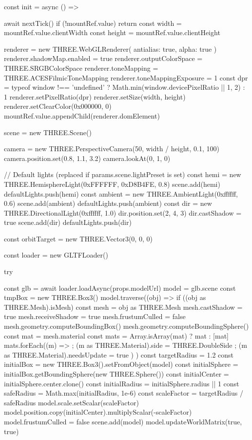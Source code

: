 \documentclass[twoside]{thesis-cls-Miya} %
\begin{document}
const init = async () => {
  await nextTick()
  if (!mountRef.value) return
  const width = mountRef.value.clientWidth
  const height = mountRef.value.clientHeight

  renderer = new THREE.WebGLRenderer({ antialias: true, alpha: true })
  renderer.shadowMap.enabled = true
  renderer.outputColorSpace = THREE.SRGBColorSpace
  renderer.toneMapping = THREE.ACESFilmicToneMapping
  renderer.toneMappingExposure = 1
  const dpr = typeof window !== 'undefined' ? Math.min(window.devicePixelRatio || 1, 2) : 1
  renderer.setPixelRatio(dpr)
  renderer.setSize(width, height)
  renderer.setClearColor(0x000000, 0)
  mountRef.value.appendChild(renderer.domElement)

  scene = new THREE.Scene()

  camera = new THREE.PerspectiveCamera(50, width / height, 0.1, 100)
  camera.position.set(0.8, 1.1, 3.2)
  camera.lookAt(0, 1, 0)

  // Default lights (replaced if params.scene.lightPreset is set)
  const hemi = new THREE.HemisphereLight(0xFFFFFF, 0xD8B4FE, 0.8)
  scene.add(hemi)
  defaultLights.push(hemi)
  const ambient = new THREE.AmbientLight(0xffffff, 0.6)
  scene.add(ambient)
  defaultLights.push(ambient)
  const dir = new THREE.DirectionalLight(0xffffff, 1.0)
  dir.position.set(2, 4, 3)
  dir.castShadow = true
  scene.add(dir)
  defaultLights.push(dir)

  const orbitTarget = new THREE.Vector3(0, 0, 0)

  const loader = new GLTFLoader()

  try {
    const glb = await loader.loadAsync(props.modelUrl)
    model = glb.scene
    const tmpBox = new THREE.Box3()
    model.traverse((obj) => {
      if ((obj as THREE.Mesh).isMesh) {
        const mesh = obj as THREE.Mesh
        mesh.castShadow = true
        mesh.receiveShadow = true
        mesh.frustumCulled = false
        mesh.geometry.computeBoundingBox()
        mesh.geometry.computeBoundingSphere()
        const mat = mesh.material
        const mats = Array.isArray(mat) ? mat : [mat]
        mats.forEach((m) => {
          ; (m as THREE.Material).side = THREE.DoubleSide
            ; (m as THREE.Material).needsUpdate = true
        })
      }
    })
    const targetRadius = 1.2
    const initialBox = new THREE.Box3().setFromObject(model)
    const initialSphere = initialBox.getBoundingSphere(new THREE.Sphere())
    const initialCenter = initialSphere.center.clone()
    const initialRadius = initialSphere.radius || 1
    const safeRadius = Math.max(initialRadius, 1e-6)
    const scaleFactor = targetRadius / safeRadius
    model.scale.setScalar(scaleFactor)
    model.position.copy(initialCenter).multiplyScalar(-scaleFactor)
    model.frustumCulled = false
    scene.add(model)
    model.updateWorldMatrix(true, true)

}}
\end{document}
